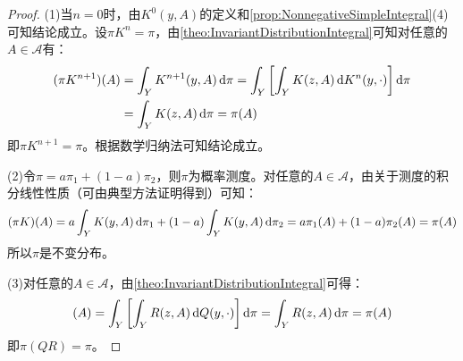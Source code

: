 \begin{proof}
	(1)当$n=0$时，由$K^0(y,A)$的定义和\cref{prop:NonnegativeSimpleIntegral}(4)可知结论成立。设$\pi K^n=\pi$，由\cref{theo:InvariantDistributionIntegral}可知对任意的$A\in\mathscr{A}$有：
	\begin{align*}
		(\pi K^{n+1})(A)&=\int_{Y}K^{n+1}(y,A)\mathop{}\!\mathrm{d}\pi=\int_{Y}\left[\int_{Y}K(z,A)\mathop{}\!\mathrm{d} K^n(y,\cdot)\right]\mathop{}\!\mathrm{d}\pi \\
		&=\int_{Y}K(z,A)\mathop{}\!\mathrm{d}\pi=\pi(A)
	\end{align*}
	即$\pi K^{n+1}=\pi$。根据数学归纳法可知结论成立。\par
	(2)令$\pi=a\pi_1+(1-a)\pi_2$，则$\pi$为概率测度。对任意的$A\in\mathscr{A}$，由关于测度的积分线性性质（可由典型方法证明得到）可知：
	\begin{equation*}
		(\pi K)(A)=a\int_{Y}K(y,A)\mathop{}\!\mathrm{d}\pi_1+(1-a)\int_{Y}K(y,A)\mathop{}\!\mathrm{d}\pi_2=a\pi_1(A)+(1-a)\pi_2(A)=\pi(A)
	\end{equation*}
	所以$\pi$是不变分布。\par
	(3)对任意的$A\in\mathscr{A}$，由\cref{theo:InvariantDistributionIntegral}可得：
	\begin{align*}
		[\pi(QR)](A)=\int_{Y}\left[\int_{Y}R(z,A)\dif Q(y,\cdot)\right]\dif\pi=\int_{Y}R(z,A)\dif\pi=\pi(A)
	\end{align*}
	即$\pi(QR)=\pi$。
\end{proof}
